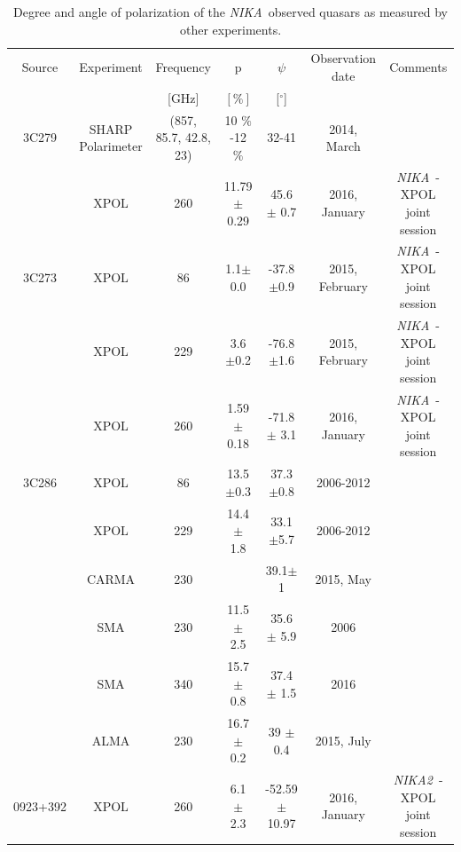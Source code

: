 \documentclass[twocolumn, traditabstract]{aa}
\newcommand{\nika}{{\it NIKA}}
\newcommand{\nikad}{{\it NIKA2}}
\begin{document}
\begin{table}
  \begin{center}
    \caption{Degree and angle of polarization of the \nika\ observed quasars as measured by other experiments.}
    \begin{tabular}{ccccccc}
      \hline
      \hline
      Source & Experiment & Frequency & p       & $\psi$     & Observation date & Comments\\
             &            &            [GHz] & $[ \%]$ & [$^\circ$] &
      & \\
      \hline
      \hline
      3C279 &  SHARP Polarimeter &  (857, 85.7, 42.8, 23) &  10 $\%$-12 $\%$ & 32-41 &  2014, March & \citep{2015ApJ...808L..26L} \\
      &  XPOL & 260 & 11.79  $\pm$ 0.29  & 45.6 $\pm$ 0.7 & 2016, January & \nika\ - XPOL joint session \\	
      \hline
           3C273 &   XPOL &    86    &   1.1$\pm$0.0 & -37.8$\pm$0.9 & 2015, February & \nika\ - XPOL joint session\\
           & XPOL &   229 &  3.6 $\pm$0.2 & -76.8$\pm$1.6 & 2015, February & \nika\ - XPOL joint session \\
            & XPOL &  260 & 1.59  $\pm$ 0.18  & -71.8 $\pm$ 3.1 & 2016, January & \nika\ - XPOL joint session \\
             \hline
      3C286 & XPOL & 86 & 13.5 $\pm$0.3 & 37.3 $\pm$0.8 & 2006-2012 &\citep{xpol}\\
      	& XPOL & 229 & 14.4 $\pm$ 1.8 & 33.1 $\pm$5.7 & 2006-2012 & \citep{xpol}\\
            & CARMA & 230 & & 39.1$\pm$ 1 & 2015, May & \citep{carma}\\
            & SMA & 230 & 11.5 $\pm$ 2.5 & 35.6 $\pm$ 5.9 & 2006  & \citep{2006PhDT........32M}\\
            & SMA &  340 &  15.7 $\pm$ 0.8 & 37.4 $\pm$ 1.5 & 2016 &\citep{2016arXiv160806283H}\\
            & ALMA & 230 & 16.7 $\pm$ 0.2 & 39 $\pm$ 0.4 & 2015, July & \citep{2016ApJ...824..132N}\\
      \hline
    0923+392 &  XPOL & 260 & 6.1  $\pm$ 2.3  & -52.59 $\pm$ 10.97 & 2016, January & \nikad\ - XPOL joint session \\
      \hline
      \hline
    \end{tabular}
    \label{tab:tab_quasar}
  \end{center}
\end{table} 
 
\end{document}
